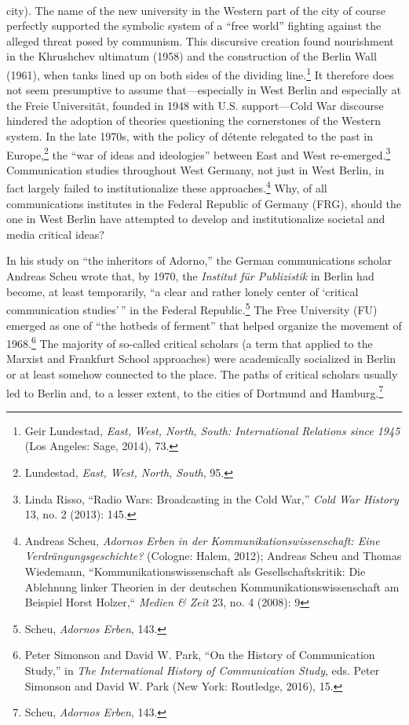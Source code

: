 \documentclass{tufte-handout}
\begin{document}
\\\noindent city).
The name of the new university in the Western part of the city of course
perfectly supported the symbolic system of a ``free world'' fighting
against the alleged threat posed by communism. This discursive creation
found nourishment in the Khrushchev ultimatum (1958) and the
construction of the Berlin Wall (1961), when tanks lined up on both
sides of the dividing line.\footnote{Geir Lundestad, \emph{East, West,
  North, South: International Relations since 1945} (Los Angeles: Sage,
  2014), 73.} It therefore does not seem presumptive to assume
that---especially in West Berlin and especially at the Freie
Universität, founded in 1948 with U.S. support---Cold War discourse
hindered the adoption of theories questioning the cornerstones of the
Western system. In the late 1970s, with the policy of détente relegated
to the past in Europe,\footnote{Lundestad, \emph{East, West, North,
  South}, 95.} the ``war of ideas and ideologies'' between East and West
re-emerged.\footnote{Linda Risso, ``Radio Wars: Broadcasting in the Cold
  War,'' \emph{Cold War History} 13, no. 2 (2013): 145.} Communication
studies throughout West Germany, not just in West Berlin, in fact
largely failed to institutionalize these approaches.\footnote{Andreas
  Scheu, \emph{Adornos Erben in der Kommunikationswissenschaft: Eine
  Verdrängungsgeschichte?} (Cologne: Halem, 2012); Andreas Scheu and
  Thomas Wiedemann, ``Kommunikationswissenschaft als
  Gesellschaftskritik: Die Ablehnung linker Theorien in der deutschen
  Kommunikationswissenschaft am Beispiel Horst Holzer,`` \emph{Medien \&
  Zeit} 23, no. 4 (2008): 9} Why, of all communications institutes in
the Federal Republic of Germany (FRG), should the one in West Berlin
have attempted to develop and institutionalize societal and media
critical ideas?

In his study on ``the inheritors of Adorno,'' the German communications
scholar Andreas Scheu wrote that, by 1970, the \emph{Institut für
Publizistik} in Berlin had become, at least temporarily, ``a clear and
rather lonely center of `critical communication studies'\,'' in the
Federal Republic.\footnote{Scheu, \emph{Adornos Erben}, 143.} The Free
University (FU) emerged as one of ``the hotbeds of ferment'' that helped
organize the movement of 1968.\footnote{Peter Simonson and David W.
  Park, ``On the History of Communication Study,'' in \emph{The
  International History of Communication Study}, eds. Peter Simonson and
  David W. Park (New York: Routledge, 2016), 15.} The majority of
so-called critical scholars (a term that applied to the Marxist and
Frankfurt School approaches) were academically socialized in Berlin or
at least somehow connected to the place. The paths of critical scholars
usually led to Berlin and, to a lesser extent, to the cities of Dortmund
and Hamburg.\footnote{Scheu, \emph{Adornos Erben}, 143.}
\end{document}
